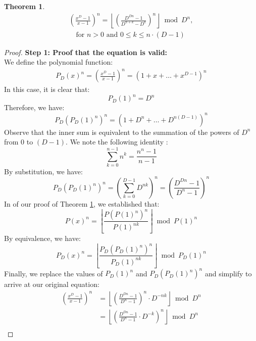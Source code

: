 \documentclass{article}
\theoremstyle{plain}
\theoremstyle{definition}
\newtheorem{thm}{Theorem}
\begin{document}
\begin{thm}
\label{thm:4}
\begin{align*}
[x^k] \left(\frac{x^{D}-1}{x-1}\right)^n = \left\lfloor \left(\frac{D^{Dn} - 1}{D^{n+k} - D^k}\right)^n\right\rfloor \bmod D^n, \\ \quad \text{for } n > 0 \text{ and } 0 \leq k \leq n \cdot (D-1)
\end{align*}
\end{thm}
\begin{proof}
\textbf{Step 1: Proof that the equation is valid:} \\
We define the polynomial function:
\begin{align}
P_D(x)^n = \left(\frac{x^{D}-1}{x-1}\right)^n = (1 + x + \ldots + x^{D-1})^n
\end{align}
In this case, it is clear that:
\begin{equation}
P_D(1)^n = D^n
\end{equation}
Therefore, we have:
\begin{equation}
P_D(P_D(1)^n)^n = (1 + D^n + \ldots + D^{n (D - 1)})^n
\end{equation}
Observe that the inner sum is equivalent to the summation of the powers of $D^n$ from $0$ to $(D - 1)$. We note the following identity \cite{A023037}:
\begin{equation}
\sum_{k=0}^{n-1} n^k = \frac{n^{n} - 1}{n - 1}
\end{equation}
By substitution, we have:
\begin{equation}
P_D(P_D(1)^n)^n = \left(\sum_{k=0}^{D-1} D^{nk}\right)^n = \left(\frac{D^{Dn} - 1}{D^{n} - 1}\right)^n
\end{equation}
In of our proof of Theorem \ref{thm:4}, we established that:
\begin{equation}
[x^k] P(x)^{n} = \left\lfloor\frac{P(P(1)^n)^{n}}{P(1)^{n k}}\right\rfloor \bmod{P(1)^{n}}
\end{equation}
By equivalence, we have:
\begin{equation}
[x^k] P_D(x)^{n} = \left\lfloor\frac{P_D(P_D(1)^n)^{n}}{P_D(1)^{n k}}\right\rfloor \bmod{P_D(1)^{n}}
\end{equation}
Finally, we replace the values of $P_D(1)^n$ and $P_D(P_D(1)^n)^n$ and simplify to arrive at our original equation:
\begin{align}
[x^k] \left(\frac{x^{D}-1}{x-1}\right)^n &= \left\lfloor \left(\frac{D^{Dn} - 1}{D^{n} - 1}\right)^n \cdot D^{-n k}\right\rfloor \bmod D^n \\
&= \left\lfloor \left(\frac{D^{Dn} - 1}{D^{n} - 1} \cdot D^{-k}\right)^n\right\rfloor \bmod D^n \\

\end{align}
\end{proof}
\end{document}

